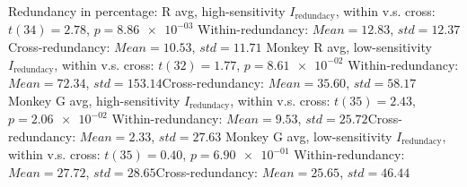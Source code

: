 Redundancy in percentage: \nMonkey R avg, high-sensitivity $I_\textrm{redundacy}$, within v.s. cross: $t(34) = 2.78$, $p = \num{8.86e-03}$ 
Within-redundancy: $Mean = 12.83$, $std = 12.37$Cross-redundancy: $Mean = 10.53$, $std = 11.71$ 
Monkey R avg, low-sensitivity $I_\textrm{redundacy}$, within v.s. cross: $t(32) = 1.77$, $p = \num{8.61e-02}$ 
Within-redundancy: $Mean = 72.34$, $std = 153.14$Cross-redundancy: $Mean = 35.60$, $std = 58.17$ 
Monkey G avg, high-sensitivity $I_\textrm{redundacy}$, within v.s. cross: $t(35) = 2.43$, $p = \num{2.06e-02}$ 
Within-redundancy: $Mean = 9.53$, $std = 25.72$Cross-redundancy: $Mean = 2.33$, $std = 27.63$ 
Monkey G avg, low-sensitivity $I_\textrm{redundacy}$, within v.s. cross: $t(35) = 0.40$, $p = \num{6.90e-01}$ 
Within-redundancy: $Mean = 27.72$, $std = 28.65$Cross-redundancy: $Mean = 25.65$, $std = 46.44$ 

